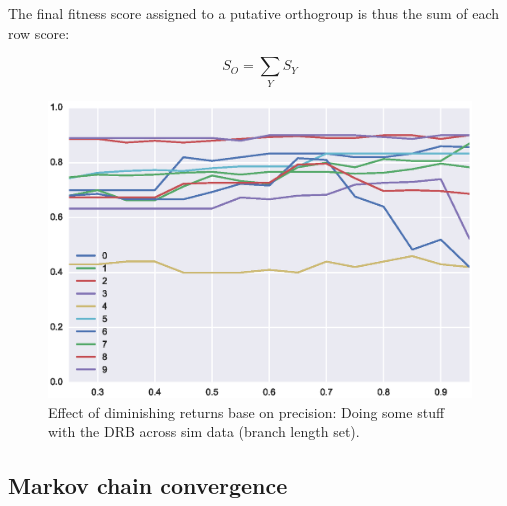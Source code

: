 \documentclass[twocolumn]{bmcart}%
\begin{document}
The final fitness score assigned to a putative orthogroup is thus the sum of each row score:

\[
S_O = \sum_{Y} S_Y
\]

\begin{figure}[t]
  \begin{center}
  \includegraphics[height=0.22\textheight]{../figures/dim_ret_precision_line.eps}
\end{center}
\caption{Effect of diminishing returns base on precision: Doing some stuff with the DRB across sim data (branch length set).}
\label{fig:dim_rets}
\end{figure}


\subsection{Markov chain convergence}\label{subsec:markovChainConvergence}
\lipsum[3]
\end{document}
